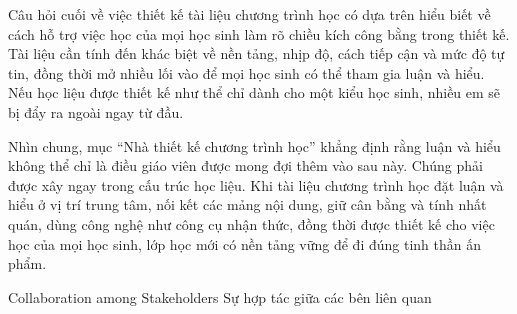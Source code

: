 {{    Câu hỏi cuối về việc thiết kế tài liệu chương trình học có dựa trên hiểu biết về cách hỗ trợ việc học của mọi học sinh làm rõ chiều kích công bằng trong thiết kế. Tài liệu cần tính đến khác biệt về nền tảng, nhịp độ, cách tiếp cận và mức độ tự tin, đồng thời mở nhiều lối vào để mọi học sinh có thể tham gia luận và hiểu. Nếu học liệu được thiết kế như thể chỉ dành cho một kiểu học sinh, nhiều em sẽ bị đẩy ra ngoài ngay từ đầu.

    Nhìn chung, mục ``Nhà thiết kế chương trình học'' khẳng định rằng luận và hiểu không thể chỉ là điều giáo viên được mong đợi thêm vào sau này. Chúng phải được xây ngay trong cấu trúc học liệu. Khi tài liệu chương trình học đặt luận và hiểu ở vị trí trung tâm, nối kết các mảng nội dung, giữ cân bằng và tính nhất quán, dùng công nghệ như công cụ nhận thức, đồng thời được thiết kế cho việc học của mọi học sinh, lớp học mới có nền tảng vững để đi đúng tinh thần ấn phẩm.}
  }

\ParallelSection
  {Collaboration among Stakeholders}
  {Sự hợp tác giữa các bên liên quan}
  {}

